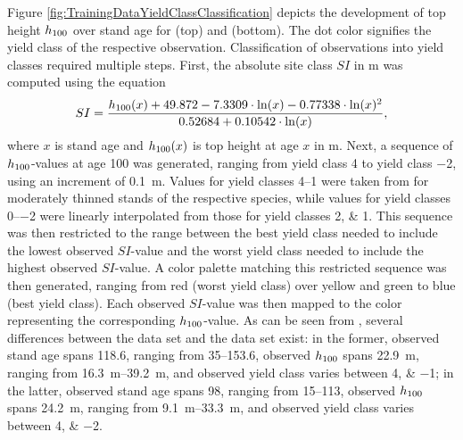 Figure \ref{fig:TrainingDataYieldClassClassification} depicts the development of top height \(h_{100}\) over stand age for \Beech{} (top) and \Spruce{} (bottom).  The dot color signifies the yield class of the respective observation.  Classification of observations into yield classes required multiple steps.  First, the absolute site class \(SI\) in \si{\meter} was computed using the equation
\begin{equation}
  \label{eq:NagelFunctionSolvedForSI}
  SI = \frac{h_{100}(x) + 49.872 - 7.3309 \cdot \ln(x) - 0.77338 \cdot \ln(x)^2 }{0.52684 + 0.10542 \cdot \ln(x)} ,
\end{equation}
\parencite{Nagel1999} where \(x\) is stand age and \(h_{100}(x)\) is top height at age \(x\) in \si{\meter}.  Next, a sequence of \(h_{100}{}\)-values at age \SI{100}{\years} was generated, ranging from yield class \num{4} to yield class \num{-2}, using an increment of \SI{0.1}{\meter}.  Values for yield classes \numrange{4}{1} were taken from \textcite{Schober1995} for moderately thinned stands of the respective species, while values for yield classes \numrange{0}{-2} were linearly interpolated from those for yield classes \numlist{2; 1}.  This sequence was then restricted to the range between the best yield class needed to include the lowest observed \(SI\)-value and the worst yield class needed to include the highest observed \(SI\)-value.  A color palette matching this restricted sequence was then generated, ranging from red (worst yield class) over yellow and green to blue (best yield class).  Each observed \(SI\)-value was then mapped to the color representing the corresponding \(h_{100}{}\)-value.  As can be seen from , several differences between the \Beech{} data set and the \Spruce{} data set exist:
in the former, observed stand age spans \SI{118.6}{\years}, ranging from \SIrange{35}{153.6}{\years}, observed \(h_{100}{}\) spans \SI{22.9}{\meter}, ranging from \SIrange{16.3}{39.2}{\meter}, and observed yield class varies between \numlist{4; -1};
in the latter, observed stand age spans \SI{98}{\years}, ranging from \SIrange{15}{113}{\years}, observed \(h_{100}{}\) spans \SI{24.2}{\meter}, ranging from \SIrange{9.1}{33.3}{\meter}, and observed yield class varies between \numlist{4; -2}.

